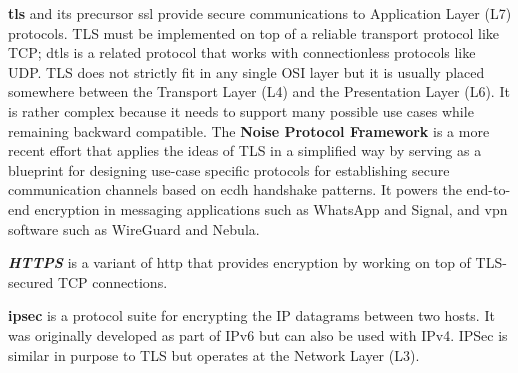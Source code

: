 \textbf{\acrfull{tls}} \autocite{tlsRFC} and its precursor \gls{ssl}
provide secure communications to Application Layer (L7) protocols. TLS
must be implemented on top of a reliable transport protocol like TCP;
\gls{dtls} is a related protocol that works with connectionless
protocols like UDP. TLS does not strictly fit in any single OSI layer
but it is usually placed somewhere between the Transport Layer (L4) and
the Presentation Layer (L6). It is rather complex because it needs to
support many possible use cases while remaining backward compatible.
 
The \textbf{Noise Protocol Framework} \autocite{noiseDocs}
 is a more 
 recent effort that applies the
ideas of TLS in a simplified way by serving as a blueprint for designing
use-case specific protocols for establishing secure communication
channels based on \gls{ecdh} handshake patterns. It powers the
end-to-end encryption in messaging applications such as WhatsApp and
Signal, and \gls{vpn} software such as WireGuard and Nebula.

\textbf{\emph{HTTPS}} \autocite{httpsRFC} is a variant of \gls{http}
that provides encryption by working on top of TLS-secured TCP
connections.


\textbf{\acrfull{ipsec}} is a protocol suite for encrypting the IP
datagrams between two hosts. It was originally developed as part of IPv6
but can also be used with IPv4. IPSec is similar in purpose to TLS but
operates at the Network Layer (L3).




